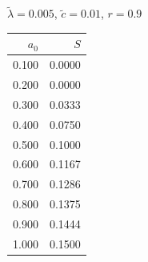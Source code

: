 \documentclass[11pt,a4paper]{article}
\begin{document}
\begin{minipage}[t]{\textwidth}
\begin{minipage}[t]{0.32\textwidth}
        \footnotesize
        \begin{flushleft}$\tilde{\lambda}=0.005$, $\tilde{c}=0.01$, $r=0.9$\end{flushleft}
        \begin{tabular}[t]{rr}
            $a_0$ & $S$ \\
            \hline
             0.100 & 0.0000 \\
             0.200 & 0.0000 \\
             0.300 & 0.0333 \\
             0.400 & 0.0750 \\
             0.500 & 0.1000 \\
             0.600 & 0.1167 \\
             0.700 & 0.1286 \\
             0.800 & 0.1375 \\
             0.900 & 0.1444 \\
             1.000 & 0.1500 \\
        \end{tabular}
    \end{minipage}
\end{minipage}
\end{document}
